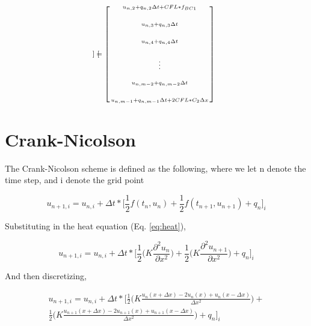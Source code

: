 \documentclass[10pt, letter, showtrims]{extarticle}
\begin{document}
\begin{fleqn}
\begin{equation}
\begin{medsize}
\begin{bmatrix}
					\end{bmatrix}
					=
					\begin{bmatrix}
						\begin{smallmatrix}
							u_{n, 2} + q_{n, 2} \Delta t + CFL * f_{BC1}             \\[1.5em]
							u_{n, 3} + q_{n, 3} \Delta t                             \\[1.5em]
							u_{n, 4} + q_{n, 4} \Delta t                             \\[1.5em]
							\vdots                                                   \\[1.5em]
							u_{n, m-2} + q_{n, m-2} \Delta t                         \\[1.5em]
							u_{n, m-1} + q_{n, m-1} \Delta t + 2CFL * C_{2} \Delta x
						\end{smallmatrix}
					\end{bmatrix}
				\end{medsize}
			\end{equation} 
		\end{fleqn}   		
    		
		\pagebreak
		
		\noindent
		\section{Crank-Nicolson}
		
		\noindent
		The Crank-Nicolson scheme is defined as the following, where we let n denote the time step, and i denote the grid point
		
		\begin{equation}
			u_{n+1,i} = u_{n,i} + \Delta t * \Big[ \frac{1}{2} f(t_{n}, u_{n}) + \frac{1}{2} f(t_{n+1}, u_{n+1}) + q_{n} \Big]_{i}
		\end{equation}
		
		\noindent
		Substituting in the heat equation (Eq. \ref{eq:heat}),
		
		\begin{equation}
			u_{n+1,i} = u_{n,i} + \Delta t * \Big[ \frac{1}{2} \big( K \frac{\partial^{2} u_{n}}{\partial x^{2}} \big) + \frac{1}{2} \big( K \frac{\partial^{2} u_{n+1}}{\partial x^{2}} \big) + q_{n} \Big]_{i}
		\end{equation}
		
		\noindent
		And then discretizing,
		
		\begin{equation}
		\label{eq:cn}
			\begin{split}
			u_{n+1,i} = u_{n,i} + \Delta t * \Big[ \frac{1}{2} \big( K \frac{u_{n}(x + \Delta x) - 2 u_{n}(x) + u_{n}(x - \Delta x)}{\Delta x^{2}} \big) + \\
			 \frac{1}{2} \big( K \frac{u_{n+1}(x + \Delta x) - 2 u_{n+1}(x) + u_{n+1}(x - \Delta x)}{\Delta x^{2}} \big) + q_{n} \Big]_{i}
			\end{split}
		\end{equation}
		
\end{document}
